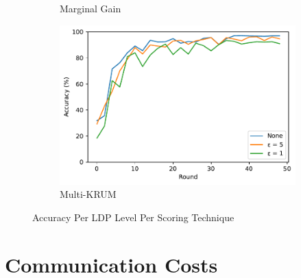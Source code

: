 \begin{figure}[!ht]
\begin{subfigure}[b]{0.49\textwidth}
        \caption{Marginal Gain}
    \end{subfigure}
    \hfill
    \begin{subfigure}[b]{0.49\textwidth}
        \centering
        \includegraphics[width=\textwidth]{graphics/05_priv_accuracy_multikrum.pdf}
        \caption{Multi-KRUM}
    \end{subfigure}
    \caption{Accuracy Per LDP Level Per Scoring Technique}
    \label{fig:accuracy_priv}
\end{figure}

\section{Communication Costs}



